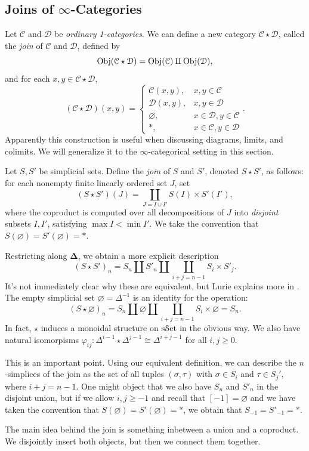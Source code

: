 \subsection{Joins of $\infty $-Categories}

Let $\mathcal{C} $ and $\mathcal{D} $ be \emph{ordinary 1-categories}. We can define a new category $\mathcal{C} \star \mathcal{D} $, called the \emph{join} of $\mathcal{C} $ and $\mathcal{D} $, defined by
\[
	\operatorname{Obj}(\mathcal{C} \star \mathcal{D} ) =\operatorname{Obj}(\mathcal{C} ) \amalg \operatorname{Obj}(\mathcal{D} ),
\]
and for each $x,y\in \mathcal{C} \star \mathcal{D} $,
\[
	(\mathcal{C} \star \mathcal{D} )(x,y)=
	\begin{cases}
		\mathcal{C} (x,y),&x,y\in \mathcal{C} \\
		\mathcal{D} (x,y),&x,y\in \mathcal{D} \\
		\varnothing ,&x\in \mathcal{D} ,y\in \mathcal{C} \\
		*,&x\in \mathcal{C} ,y\in \mathcal{D} 
	\end{cases}
.\]
Apparently this construction is useful when discussing diagrams, limits, and colimits. We will generalize it to the $\infty $-categorical setting in this section.

\begin{definition}\label{1.2.8.1}
	Let $S,S'$ be simplicial sets. Define the \emph{join} of $S$ and $S'$, denoted $S\star S'$, as follows: for each nonempty finite linearly ordered set $J$, set
	\[
		(S\star S')(J)=\coprod_{J=I\cup I'} S(I)\times S'(I'),
	\]
	where the coproduct is computed over all decompositions of $J$ into \emph{disjoint} subsets $I,I'$, satisfying $\max I < \min I'$. We take the convention that $S(\varnothing )=S'(\varnothing )=*$.
\end{definition}

Restricting along $\boldsymbol{\Delta} $, we obtain a more explicit description
\[
	(S\star S')_n=S_n\amalg  S'_n\amalg  \coprod_{i+j=n-1} S_i\times S'_j
.\]
It's not immediately clear why these are equivalent, but Lurie explains more in \cite[016K]{kerodon}. The empty simplicial set $\varnothing =\Delta ^{-1} $ is an identity for the operation:
\[
	(S\star \varnothing )_n=S_n\amalg \varnothing \amalg \coprod_{i+j=n-1} S_i \times \varnothing =S_n
.\]
In fact, $\star $ induces a monoidal structure on $\mathrm{s}\mathcal{S}\mathrm{et} $ in the obvious way. We also have natural isomorpisms $\varphi _{ij} : \Delta ^{i-1} \star \Delta ^{j-1} \cong \Delta ^{i+j-1} $ for all $i,j\geq 0$.

\begin{remark}\label{1.2.8.2}
	This is an important point. Using our equivalent definition, we can describe the $n$-simplices of the join as the set of all tuples $(\sigma ,\tau )$ with $\sigma \in S_i$ and $\tau \in S_j'$, where $i+j=n-1$. One might object that we also have $S_n$ and $S'_n$ in the disjoint union, but if we allow $i,j\geq -1$ and recall that $[-1]=\varnothing $ and we have taken the convention that $S(\varnothing )=S'(\varnothing)=*$, we obtain that $S_{-1} =S'_{-1} =*$.

	The main idea behind the join is something inbetween a union and a coproduct. We disjointly insert both objects, but then we connect them together.
\end{remark}


